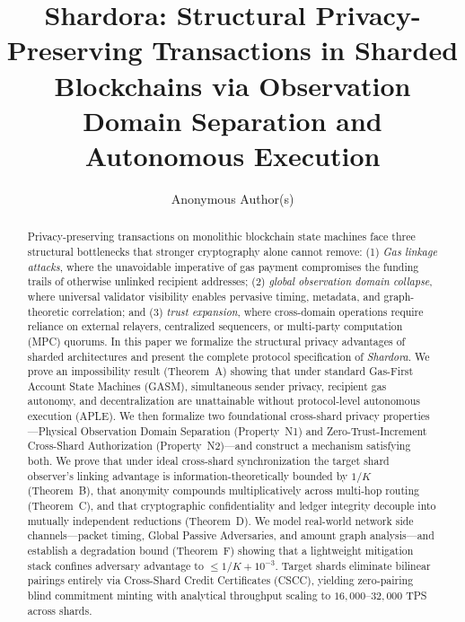 \documentclass[sigconf,nonacm]{acmart}
\begin{document}
\title{Shardora: Structural Privacy-Preserving Transactions in Sharded Blockchains via Observation Domain Separation and Autonomous Execution}

\author{Anonymous Author(s)}

\begin{abstract}
Privacy-preserving transactions on monolithic blockchain state machines face three structural bottlenecks that stronger cryptography alone cannot remove: (1) \emph{Gas linkage attacks}, where the unavoidable imperative of gas payment compromises the funding trails of otherwise unlinked recipient addresses; (2) \emph{global observation domain collapse}, where universal validator visibility enables pervasive timing, metadata, and graph-theoretic correlation; and (3) \emph{trust expansion}, where cross-domain operations require reliance on external relayers, centralized sequencers, or multi-party computation (MPC) quorums. In this paper we formalize the structural privacy advantages of sharded architectures and present the complete protocol specification of \emph{Shardora}. We prove an impossibility result (Theorem~A) showing that under standard Gas-First Account State Machines (GASM), simultaneous sender privacy, recipient gas autonomy, and decentralization are unattainable without protocol-level autonomous execution (APLE). We then formalize two foundational cross-shard privacy properties---Physical Observation Domain Separation (Property~N1) and Zero-Trust-Increment Cross-Shard Authorization (Property~N2)---and construct a mechanism satisfying both. We prove that under ideal cross-shard synchronization the target shard observer's linking advantage is information-theoretically bounded by $1/K$ (Theorem~B), that anonymity compounds multiplicatively across multi-hop routing (Theorem~C), and that cryptographic confidentiality and ledger integrity decouple into mutually independent reductions (Theorem~D). We model real-world network side channels---packet timing, Global Passive Adversaries, and amount graph analysis---and establish a degradation bound (Theorem~F) showing that a lightweight mitigation stack confines adversary advantage to $\le 1/K + 10^{-3}$. Target shards eliminate bilinear pairings entirely via Cross-Shard Credit Certificates (CSCC), yielding zero-pairing blind commitment minting with analytical throughput scaling to $16{,}000$--$32{,}000$ TPS across shards.
\end{abstract}
\end{document}
